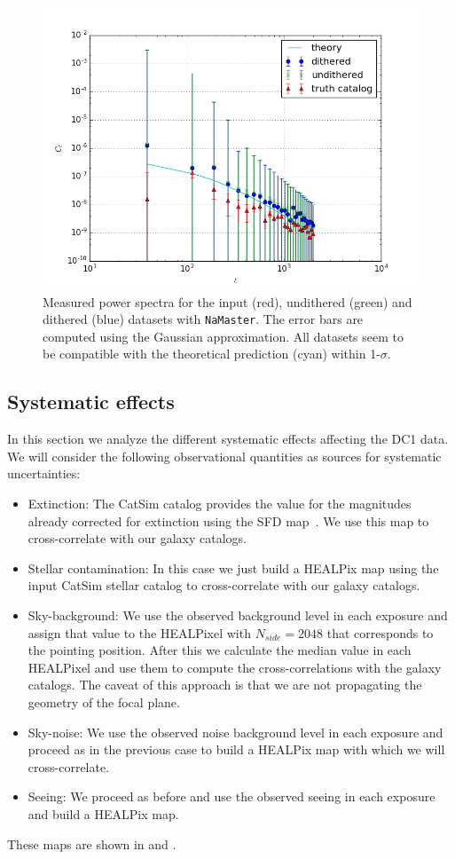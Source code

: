 \documentclass[\docopts]{\docclass}
\begin{document}
\begin{figure}
\centering
\includegraphics[width=0.9\columnwidth]{results_Cl_25p3.png}
\caption{Measured power spectra for the input (red), undithered (green) and dithered (blue) datasets with \texttt{NaMaster}. The error bars are computed using the Gaussian approximation. All datasets seem to be compatible with the theoretical prediction (cyan) within 1-$\sigma$.}
\label{fig:power_spectra}
\end{figure}
\subsection{Systematic effects}
In this section we analyze the different systematic effects affecting the DC1 data. We will consider the following observational quantities as sources for systematic uncertainties:
\begin{itemize}
\item Extinction: The CatSim catalog provides the value for the magnitudes already corrected for extinction using the SFD map~\citep{1998ApJ...500..525S}. We use this map to cross-correlate with our galaxy catalogs.
\item Stellar contamination: In this case we just build a HEALPix map using the input CatSim stellar catalog to cross-correlate with our galaxy catalogs.
\item Sky-background: We use the observed background level in each exposure and assign that value to the HEALPixel with $N_{side}=2048$ that corresponds to the pointing position. After this we calculate the median value in each HEALPixel and use them to compute the cross-correlations with the galaxy catalogs. The caveat of this approach is that we are not propagating the geometry of the focal plane.
\item Sky-noise: We use the observed noise background level in each exposure and proceed as in the previous case to build a HEALPix map with which we will cross-correlate.
\item Seeing: We proceed as before and use the observed seeing in each exposure and build a HEALPix map.
\end{itemize}
These maps are shown in  and . 
\end{document}
